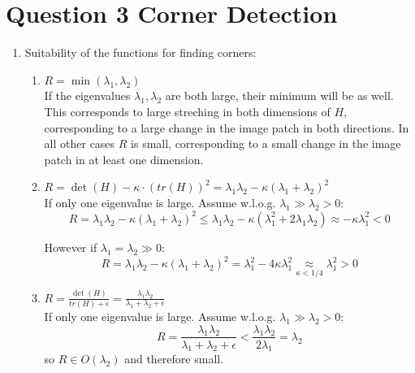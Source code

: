 \documentclass[12pt,letterpaper]{article}
\begin{document}
\section*{Question 3 Corner Detection}
\begin{enumerate}[label=(\alph*)]
	\item Suitability of the functions for finding corners:
	      \begin{enumerate}
	      	\item \( R = \min(\lambda_1, \lambda_2) \) \\
	      	      If the eigenvalues \( \lambda_1, \lambda_2 \) are both large, their minimum will be as well.
	      	      This corresponds to large streching in both dimensions of \( H \), 
	      	      corresponding to a large change in the image patch in both directions.
	      	      In all other cases \( R \) is small, 
	      	      corresponding to a small change in the image patch in at least one dimension.
	      	\item \( R = \det(H) - \kappa \cdot (tr(H))^2 = \lambda_1  \lambda_2 - \kappa(\lambda_1 + \lambda_2)^2    \)  \\
	      	      If only one eigenvalue is large. Assume w.l.o.g. \( \lambda_1 \gg \lambda_2 > 0 \):
	      	      \begin{equation}
	      	      	R = 
	      	      	\lambda_1  \lambda_2 - \kappa(\lambda_1 + \lambda_2)^2
	      	      	\leq
	      	      	\lambda_1 \lambda_2 - \kappa(\lambda_1^2 + 2 \lambda_1\lambda_2)
	      	      	\approx
	      	      	-\kappa\lambda_1^2 < 0
	      	      \end{equation}
	      	      
	      	      However if \( \lambda_1 = \lambda_2 \gg 0 \):
	      	      \begin{equation}
	      	      	R = 
	      	      	\lambda_1  \lambda_2 - \kappa(\lambda_1 + \lambda_2)^2
	      	      	=
	      	      	\lambda_1^2 - 4\kappa\lambda_1^2
	      	      	\underset{\kappa < 1/4}{\approx}
	      	      	\lambda_1^2 
	      	      	> 0
	      	      \end{equation}
	      	\item \( R = \frac{\det(H)}{tr(H) + \epsilon} 
	      	      = \frac{\lambda_1 \lambda_2}{\lambda_1 + \lambda_2 + \epsilon} \) \\
	      	      If only one eigenvalue is large. Assume w.l.o.g. \( \lambda_1 \gg \lambda_2 > 0 \):
	      	      \begin{equation}
	      	      	R 
	      	      	= \frac{\lambda_1 \lambda_2}{\lambda_1 + \lambda_2 + \epsilon}
	      	      	< \frac{\lambda_1 \lambda_2}{2\lambda_1}
	      	      	= \lambda_2
	      	      \end{equation}
	      	      so \( R \in O(\lambda_2) \) and therefore small.
	      	              

\end{enumerate}
\end{enumerate}
\end{document}
